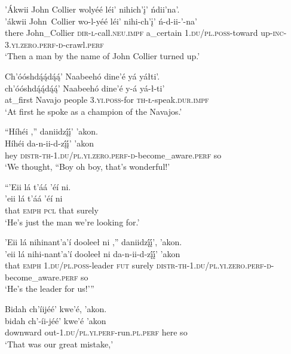\ea\label{ex:text7-5-1}
’Ákwii John Collier wolyéé léi’ nihich’į’ ńdii’na’.\\
\gll ’ákwii	John~{Collier}	wo-l-yéé	léi’	nihi-ch’į’	ń-d-ii-’-na’\\
     there	John\_Collier	\textsc{dir}-\textsc{l}-call.\textsc{neu}.\textsc{impf}	a\_certain	1.\textsc{du}/\textsc{pl}.\textsc{poss}-toward	up-\textsc{inc}-3.\textsc{yi}.\textsc{zero}.\textsc{perf}-\textsc{d}-crawl.\textsc{perf}\\
\glt `Then a man by the name of John Collier turned up.'
\z

\ea\label{ex:text7-5-2}
Ch’óóshdą́ą́dą́ą́’ Naabeehó dine’é yá yáłti’.\\
\gll ch’óóshdą́ą́dą́ą́’	Naabeehó	dine’é	y-á	yá-ł-ti’\\
     at\_first	Navajo	people	3.\textsc{yi}.\textsc{poss}-for	\textsc{th}-\textsc{ł}-speak.\textsc{dur}.\textsc{impf}\\
\glt `At first he spoke as a champion of the Navajos.'
\z

\ea\label{ex:text7-5-3}
``Híhéi ,'' daniidzį́į́’ ’akon.\\
\gll Híhéi	da-n-ii-d-zį́į́’	’akon\\
     hey	\textsc{distr}-\textsc{th}-1.\textsc{du}/\textsc{pl}.\textsc{yi}.\textsc{zero}.\textsc{perf}-\textsc{d}-become\_aware.\textsc{perf}	so\\
\glt `We thought, ``Boy oh boy, that's wonderful!'
\z

\ea\label{ex:text7-5-4}
``’Eii lá t’áá ’éí ni.\\
\gll ’eii	lá	t’áá ’éí	ni\\
     that	\textsc{emph}	\textsc{pcl} that	surely\\
\glt `He's just the man we're looking for.'
\z

\ea\label{ex:text7-5-5}
’Eii lá nihinant’a’í dooleeł ni ,'' daniidzį́į́’, ’akon.\\
\gll ’eii	lá	nihi-nant’a’í	dooleeł	ni	da-n-ii-d-zį́į́’	’akon\\
     that	\textsc{emph}	1.\textsc{du}/\textsc{pl}.\textsc{poss}-leader	\textsc{fut}	surely	\textsc{distr}-\textsc{th}-1.\textsc{du}/\textsc{pl}.\textsc{yi}.\textsc{zero}.\textsc{perf}-\textsc{d}-become\_aware.\textsc{perf}	so\\
\glt `He's the leader for us!'''
\z

\ea\label{ex:text7-6-1}
Bidah ch’íijéé’ kwe’é, ’akon.\\
\gll bidah	ch’-íi-jéé’	kwe’é	’akon\\
     downward	out-1.\textsc{du}/\textsc{pl}.\textsc{yi}.\textsc{perf}-run.\textsc{pl}.\textsc{perf}	here	so\\
\glt `That was our great mistake,'
\z

